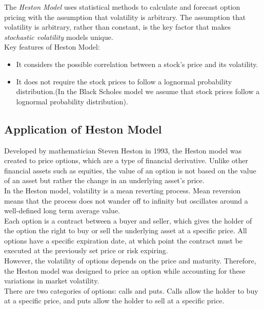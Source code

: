 The \textit{Heston Model} uses statistical methods to calculate and forecast
option pricing with the assumption that volatility is arbitrary.
The assumption that volatility is arbitrary, rather than constant,
is the key factor that makes \textit{stochastic volatility} models unique. \\

\noindent Key features of Heston Model:
\begin{itemize}
	\item It considers the possible correlation between a stock's price
	and its volatility.
	\item It does not require the stock prices to follow a lognormal
	probability distribution.(In the Black Scholes model we assume that
	stock prices follow a lognormal probability distribution).
\end{itemize}


\subsection{Application of Heston Model}

Developed by mathematician Steven Heston in 1993, the Heston model
was created to price options, which are a type of financial derivative.
Unlike other financial assets such as equities, the value of an option is
not based on the value of an asset but rather the change in an underlying
asset’s price. \\

In the Heston model, volatility is a mean reverting process.
Mean reversion means that the process does not wander off to
infinity but oscillates around a well-defined long term average value. \\

Each option is a contract between a buyer and seller, which gives the holder of
the option the right to buy or sell the underlying asset at a specific price.
All options have a specific expiration date, at which point the contract must
be executed at the previously set price or risk expiring. \\

However, the volatility of options depends on the price and maturity.
Therefore, the Heston model was designed to price an option while accounting
for these variations in market volatility. \\

There are two categories of options: calls and puts.
Calls allow the holder to buy at a specific price, and puts allow
the holder to sell at a specific price. \\

